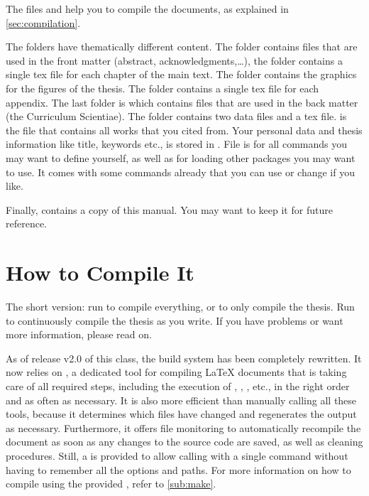 The files  and  help you to compile the
documents, as explained in \autoref{sec:compilation}.

The folders have thematically different content. The 
folder contains files that are used in the front matter (abstract,
acknowledgments,\dots), the  folder contains a single tex
file for each chapter of the main text. The  folder contains
the graphics for the figures of the thesis.  The  folder
contains a single tex file for each appendix.  The last folder is
 which contains files that are used in the back matter
(\eg the Curriculum Scientiae).  The  folder contains two data
files and a tex file.  is the  file that
contains all works that you cited from. Your personal data and thesis
information like title, keywords etc., is stored in .
File  is for all commands you may want to define
yourself, as well as for loading other packages you may want to use. It comes
with some commands already that you can use or change if you like.

Finally,  contains a copy of this manual. You may want to
keep it for future reference.


\section{How to Compile It}%
\label{sec:compilation}

The short version: run  to compile everything, or  to only compile the thesis. Run  to continuously
compile the thesis as you write. If you have problems or want more
information, please read on.

As of release v2.0 of this class, the build system has been completely
rewritten. It now relies on , a dedicated tool for compiling
\LaTeX{} documents that is taking care of all required steps, including the
execution of , , ,
 etc., in the right order and as often as necessary. It is
also more efficient than manually calling all these tools, because it
determines which files have changed and regenerates the output as necessary.
Furthermore, it offers file monitoring to automatically recompile the
document as soon as any changes to the source code are saved, as well as
cleaning procedures. Still, a  is provided to allow calling
 with a single command without having to remember all the
options and paths. For more information on how to compile using the provided
, refer to \autoref{sub:make}.

